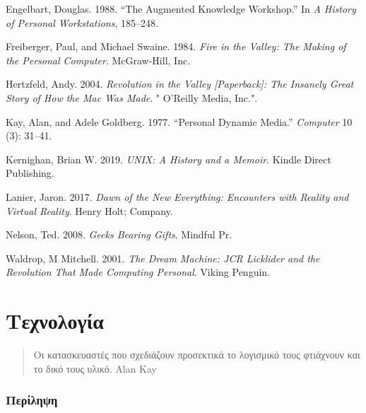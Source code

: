\documentclass[
]{article}
\newlength{\cslhangindent}
\newlength{\cslentryspacingunit} %
\newenvironment{CSLReferences}[2] %
 {%
  \setlength{\parindent}{0pt}
  \ifodd #1
  \let\oldpar\par
  \def\par{\hangindent=\cslhangindent\oldpar}
  \fi
  \setlength{\parskip}{#2\cslentryspacingunit}
 }%
 {}
\begin{document}
\hypertarget{refs}{}
\begin{CSLReferences}{0}{0}
\end{CSLReferences}

Engelbart, Douglas. 1988. {``The Augmented Knowledge Workshop.''} In
\emph{A History of Personal Workstations}, 185--248.

Freiberger, Paul, and Michael Swaine. 1984. \emph{Fire in the Valley:
The Making of the Personal Computer}. McGraw-Hill, Inc.

Hertzfeld, Andy. 2004. \emph{Revolution in the Valley
{{[}}Paperback{{]}}: The Insanely Great Story of How the Mac Was Made}.
" O'Reilly Media, Inc.".

Kay, Alan, and Adele Goldberg. 1977. {``Personal Dynamic Media.''}
\emph{Computer} 10 (3): 31--41.

Kernighan, Brian W. 2019. \emph{UNIX: A History and a Memoir}. Kindle
Direct Publishing.

Lanier, Jaron. 2017. \emph{Dawn of the New Everything: Encounters with
Reality and Virtual Reality}. Henry Holt; Company.

Nelson, Ted. 2008. \emph{Geeks Bearing Gifts}. Mindful Pr.

Waldrop, M Mitchell. 2001. \emph{The Dream Machine: JCR Licklider and
the Revolution That Made Computing Personal}. Viking Penguin.

\hypertarget{ux3c4ux3b5ux3c7ux3bdux3bfux3bbux3bfux3b3ux3afux3b1}{%
\section{Τεχνολογία}\label{ux3c4ux3b5ux3c7ux3bdux3bfux3bbux3bfux3b3ux3afux3b1}}

\begin{quote}
Οι κατασκευαστές που σχεδιάζουν προσεκτικά το λογισμικό τους φτιάχνουν
και το δικό τους υλικό. Alan Kay
\end{quote}

\hypertarget{ux3c0ux3b5ux3c1ux3afux3bbux3b7ux3c8ux3b7}{%
\subsubsection{Περίληψη}\label{ux3c0ux3b5ux3c1ux3afux3bbux3b7ux3c8ux3b7}}
\end{document}

